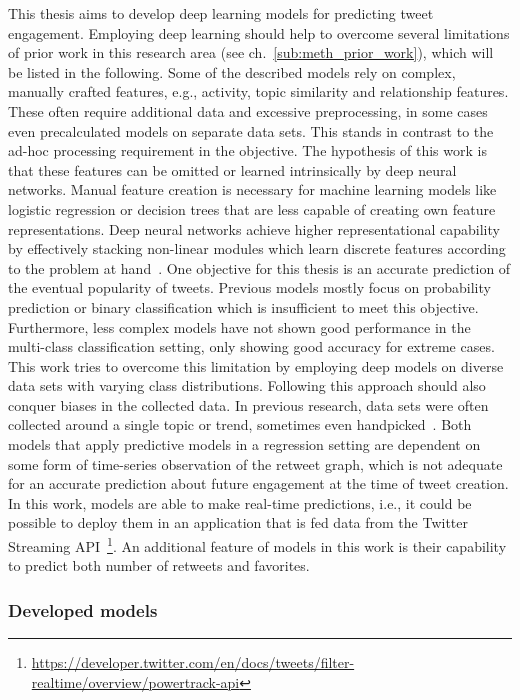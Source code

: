 This thesis aims to develop deep learning models for predicting tweet
engagement.
Employing deep learning should help to overcome several limitations of prior
work in this research area (see ch.~\ref{sub:meth_prior_work}), which will be listed in the following.
Some of the described models rely on complex, manually crafted features, e.g.,
activity, topic similarity and relationship features.
These often require additional data and excessive preprocessing, in some cases
even precalculated models on separate data sets.
This stands in contrast to the ad-hoc processing requirement in the objective.
The hypothesis of this work is that these features can be omitted or
learned intrinsically by deep neural networks.
Manual feature creation is necessary for machine learning models like logistic
regression or decision trees that are less capable of creating own feature
representations.
Deep neural networks achieve higher representational capability by effectively
stacking non-linear modules which learn discrete features according to the problem at
hand~\cite{LeCun2015}.
One objective for this thesis is an accurate prediction of the eventual popularity
of tweets.
Previous models mostly focus on probability prediction or binary classification
which is insufficient to meet this objective.
Furthermore, less complex models have not shown good performance in the multi-class
classification setting, only showing good accuracy for extreme cases.
This work tries to overcome this limitation by employing deep models on diverse
data sets with varying class distributions.
Following this approach should also conquer biases in the collected data.
In previous research, data sets were often collected around a single topic or
trend, sometimes even handpicked~\cite{Zaman2014}.
Both models that apply predictive models in a regression setting are dependent
on some form of time-series observation of the retweet graph, which is not adequate for
an accurate prediction about future engagement at the time of tweet creation.
In this work, models are able to make real-time predictions, i.e., it could
be possible to deploy them in an application that is fed data from the Twitter
Streaming API~\footnote{\url{https://developer.twitter.com/en/docs/tweets/filter-realtime/overview/powertrack-api}}.
An additional feature of models in this work is their capability to predict both
number of retweets and favorites.

\subsubsection{Developed models}

